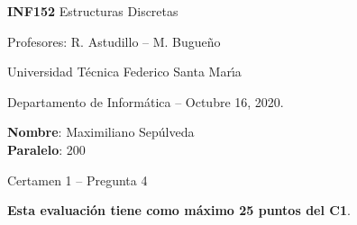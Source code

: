 \documentclass[legalpaper,10pt]{article}
\begin{document}
\thispagestyle{empty}

\begin{minipage}[t]{0.6\textwidth}

{\LARGE \textbf{INF152} Estructuras Discretas}

{\large Profesores: R. Astudillo -- M. Bugueño}

Universidad Técnica Federico Santa Mar\'{\i}a

Departamento de Informática -- Octubre 16, 2020.

\end{minipage}
\hfill
\begin{minipage}[t]{0.35\textwidth}
\textbf{Nombre}: Maximiliano Sepúlveda\\[0.3cm]
  \textbf{Paralelo}: 200
\end{minipage}

\vspace{0.8cm}

{\Large Certamen 1 -- Pregunta 4}

\vspace{0.4cm}

\textbf{Esta evaluación tiene como máximo 25 puntos del C1}.
\end{document}
